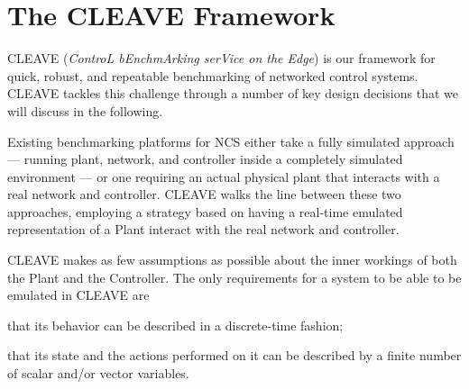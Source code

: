 \pagebreak
\section{The CLEAVE Framework}\label{sec:cleave}

CLEAVE (\emph{ControL bEnchmArking serVice on the Edge}) is our framework for quick, robust, and repeatable benchmarking of networked control systems.
CLEAVE tackles this challenge through a number of key design decisions that we will discuss in the following.

\begin{description}[wide]
    \item[Emulation approach.] 
    Existing benchmarking platforms for NCS either take a fully simulated approach --- running plant, network, and controller inside a completely simulated environment --- or one requiring an actual physical plant that interacts with a real network and controller.
    CLEAVE walks the line between these two approaches, employing a strategy based on having a real-time emulated representation of a Plant interact with the real network and controller.
    \item[Plant- and Controller-agnosticism.] 
    CLEAVE makes as few assumptions as possible about the inner workings of both the Plant and the Controller. 
    The only requirements for a system to be able to be emulated in CLEAVE are
    \begin{enumerate*}[itemjoin*={{ and }}]
        \item that its behavior can be described in a discrete-time fashion;
        \item that its state and the actions performed on it can be described by a finite number of scalar and/or vector variables.
    \end{enumerate*} 



\end{description}
